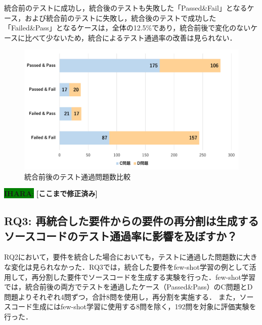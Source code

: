 \documentclass[submit,techrep,noauthor]{ipsj}
\newcommand{\ihara}[1]{\colorbox{green}{{\bf IHARA}:}{\color{blue} {\textbf{[#1]}}}}
\begin{document}
統合前のテストに成功し，統合後のテストも失敗した「Passed\&Fail」となるケース，および統合前のテストに失敗し，統合後のテストで成功した「Failed\&Pass」となるケースは，全体の12.5\%であり，統合前後で変化のないケースに比べて少ないため，統合によるテスト通過率の改善は見られない．



\begin{figure}[t]
    \centering
    \includegraphics[width=1.0\linewidth]{./Toyoshima_fig/SIGSE_PF.pdf}
    \caption{統合前後のテスト通過問題数比較}
    \label{rq2_1}
\end{figure}

\ihara{ここまで修正済み}

\subsection{RQ3: 再統合した要件からの要件の再分割は生成するソースコードのテスト通過率に影響を及ぼすか？}

RQ2において，要件を統合した場合においても，テストに通過した問題数に大きな変化は見られなかった．RQ3では，統合した要件をfew-shot学習の例として活用して，再分割した要件でソースコードを生成する実験を行った．few-shot学習では，統合前後の両方でテストを通過したケース（Passed\&Pass）のC問題とD問題よりそれぞれ4問ずつ，合計8問を使用し，再分割を実施する．
また，ソースコード生成にはfew-shot学習に使用する8問を除く，192問を対象に評価実験を行った．
\end{document}
